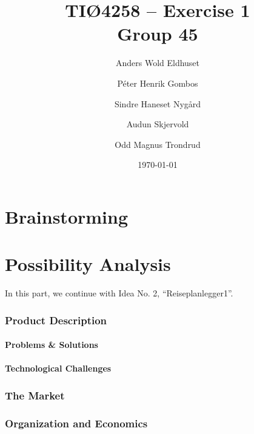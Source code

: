 \documentclass[a4paper]{article}
\title{TIØ4258 -- Exercise 1 \\ Group 45}
\author{
    Anders Wold Eldhuset \and
    Péter Henrik Gombos \and
    Sindre Haneset Nygård \and
    Audun Skjervold \and
    Odd Magnus Trondrud
}
\date{\today}
\begin{document}
    \maketitle
    \newpage
    \setcounter{secnumdepth}{2}

    \part{Brainstorming}
    	

    \part{Possibility Analysis}
    	In this part, we continue with Idea No. 2, ``Reiseplanlegger1''.
    	\section{Product Description}
    		\subsection{Problems \& Solutions}
	    		
    		\subsection{Technological Challenges}
	    			
	    \section{The Market} %
            

            

            

            

	    \section{Organization and Economics}
            
\end{document}
